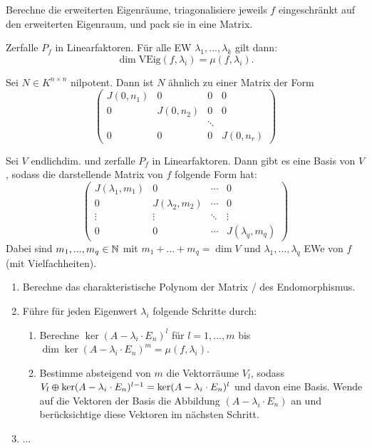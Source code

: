 \documentclass{cheat-sheet}
\newcommand{\VEig}{\mathrm{VEig}}
\begin{document}
\begin{verf}
  Berechne die erweiterten Eigenräume, triagonalisiere jeweils $f$ eingeschränkt auf den erweiterten Eigenraum, und pack sie in eine Matrix.
\end{verf}

\begin{satz}
  Zerfalle $P_f$ in Linearfaktoren. Für alle EW $\lambda_1, ..., \lambda_k$ gilt dann:
  \[ \dim \VEig(f, \lambda_i) = \mu(f, \lambda_i). \]
\end{satz}

\begin{satz}
  Sei $N \in K^{n \times n}$ nilpotent. Dann ist $N$ ähnlich zu einer Matrix der Form
  \[ \begin{pmatrix}
  J(0, n_1) & 0 & 0 & 0 \\
  0 & J(0, n_2) & 0 & 0 \\
  & & \ddots & \\
  0 & 0 & 0 & J(0, n_r)
  \end{pmatrix} \]
\end{satz}


\begin{satz}
  Sei $V$ endlichdim. und zerfalle $P_f$ in Linearfaktoren. Dann gibt es eine Basis von $V$, sodass die darstellende Matrix von $f$ folgende Form hat:
  \[ \begin{pmatrix}
  J(\lambda_1, m_1) & 0 & \cdots & 0 \\
  0 & J(\lambda_2, m_2) & \cdots & 0 \\
  \vdots & \vdots & \ddots & \vdots \\
  0 & 0 & \cdots & J(\lambda_q, m_q)
  \end{pmatrix} \]
  Dabei sind $m_1, ..., m_q \in \mathbb{N}$ mit $m_1 + ... + m_q = \dim V$ und $\lambda_1, ..., \lambda_q$ EWe von $f$ (mit Vielfachheiten).
\end{satz}


\begin{verf}[JNF]
  \begin{enumerate}
    \item Berechne das charakteristische Polynom der Matrix / des Endomorphismus.
    \item Führe für jeden Eigenwert $\lambda_i$ folgende Schritte durch:
    \begin{enumerate}
      \item Berechne $\ker (A - \lambda_i \cdot E_n)^l$ für $l = 1, ..., m$ bis $\dim \ker (A - \lambda_i \cdot E_n)^m = \mu(f, \lambda_i)$.
      \item Bestimme absteigend von $m$ die Vektorräume $V_l$, sodass $V_l \varoplus \ker (A - \lambda_i \cdot E_n)^{l-1} = \ker (A - \lambda_i \cdot E_n)^{l}$ und davon eine Basis. Wende auf die Vektoren der Basis die Abbildung $(A - \lambda_i \cdot E_n)$ an und berücksichtige diese Vektoren im nächsten Schritt.
    \end{enumerate}
    \item ...
  \end{enumerate}
\end{verf}
\end{document}
